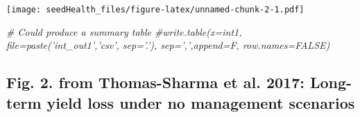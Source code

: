 \documentclass[]{article}
\newenvironment{Shaded}{\begin{snugshade}}{\end{snugshade}}
\newcommand{\CommentTok}[1]{\textcolor[rgb]{0.56,0.35,0.01}{\textit{#1}}}
\begin{document}
\texttt{[image: seedHealth\_files/figure-latex/unnamed-chunk-2-1.pdf]}

\begin{Shaded}
\begin{Highlighting}[]
\CommentTok{# Could produce a summary table}
\CommentTok{#write.table(x=int1, file=paste('int_out1','csv', sep='.'), sep=',',append=F, row.names=FALSE)}
\end{Highlighting}
\end{Shaded}

\subsection{Fig. 2. from Thomas-Sharma et al. 2017: Long-term yield loss
under no management
scenarios}\label{fig.-2.-from-thomas-sharma-et-al.-2017-long-term-yield-loss-under-no-management-scenarios}
\end{document}
